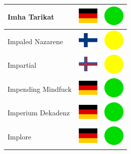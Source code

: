 \documentclass[12pt, a4paper, twoside]{report}
\begin{document}
\begin{center}
\begin{longtable}{|p{5cm}|p{2cm}|p{2cm}|}
 Imha Tarikat                                               & \includegraphics[width=1cm]{../4x3/de} &   \includegraphics[width=1cm]{../likes/y} \\ \hline
 Impaled Nazarene                                           & \includegraphics[width=1cm]{../4x3/fi} &   \includegraphics[width=1cm]{../likes/m} \\ \hline
 Impartial                                                  & \includegraphics[width=1cm]{../4x3/fo} &   \includegraphics[width=1cm]{../likes/m} \\ \hline
 Impending Mindfuck                                         & \includegraphics[width=1cm]{../4x3/de} &   \includegraphics[width=1cm]{../likes/y} \\ \hline
 Imperium Dekadenz                                          & \includegraphics[width=1cm]{../4x3/de} &   \includegraphics[width=1cm]{../likes/y} \\ \hline
 Implore                                                    & \includegraphics[width=1cm]{../4x3/de} &   \includegraphics[width=1cm]{../likes/y} \\ \hline

\end{longtable}
\end{center}
\end{document}
